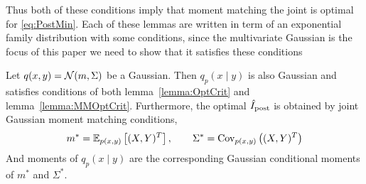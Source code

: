 Thus both of these conditions imply that moment matching the joint is
optimal for \EQN\eqref{eq:PostMin}. Each of these lemmas are written
in term of an exponential family distribution with some conditions,
since the multivariate Gaussian is the focus of this paper we need to
show that it satisfies these conditions
\begin{corollary}\label{cor:LinearGaussian}
  Let $q(x, y) = \mathcal{N}(m, \Sigma)$ be a Gaussian. Then $q_p(x \mid y)$
  is also Gaussian and satisfies conditions of both
  lemma~\ref{lemma:OptCrit} and lemma~\ref{lemma:MMOptCrit}.
  Furthermore, the optimal $\hat{I}_{\text{post}}$ is obtained by joint Gaussian
  moment matching conditions,\vspace*{-2mm}
  \[
    m^* = \mathbb{E}_{p(x,y)}\left[ (X,Y)^T \right], \qquad \Sigma^* = \text{Cov}_{p(x,y)}\left((X,Y)^T\right)
  \]
  \vspace*{-3mm}And moments of $q_p(x \mid y)$ are the corresponding Gaussian conditional moments
  of $m^*$ and $\Sigma^*$.
\end{corollary}
